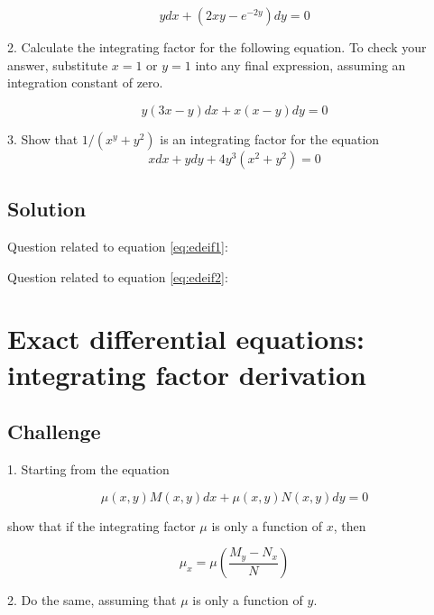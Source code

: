 \begin{equation}
    \label{eq:edeif1}
    y dx + (2 x y - e^{-2 y}) dy = 0
\end{equation}

2. Calculate the integrating factor for the following equation. To check your answer, substitute $x=1$ or $y=1$ into any final expression, assuming an integration constant of zero.

\begin{equation}
    \label{eq:edeif2}
    y(3x-y) dx + x(x-y)dy = 0
\end{equation}

3. Show that $1/(x^y+y^2)$ is an integrating factor for the equation
\begin{equation}
    x dx + y dy + 4 y^3 (x^2 + y^2) = 0
\end{equation}

\subsection*{Solution}
Question related to equation \ref{eq:edeif1}: 

Question related to equation \ref{eq:edeif2}: 

\timebox




\newpage
\section{Exact differential equations: integrating factor derivation}
\label{sec:intfacderiv}

\subsection*{Challenge}
1. Starting from the equation

\begin{equation}
    \mu(x,y) M(x,y) dx + \mu(x,y) N(x,y) dy = 0
\end{equation}

show that if the integrating factor $\mu$ is only a function of $x$, then

\begin{equation}
    \label{eq:intfacmux}
    \mu_x = \mu \left ( \frac{M_y-N_x}{N} \right )
\end{equation}

2. Do the same, assuming that $\mu$ is only a function of $y$.

